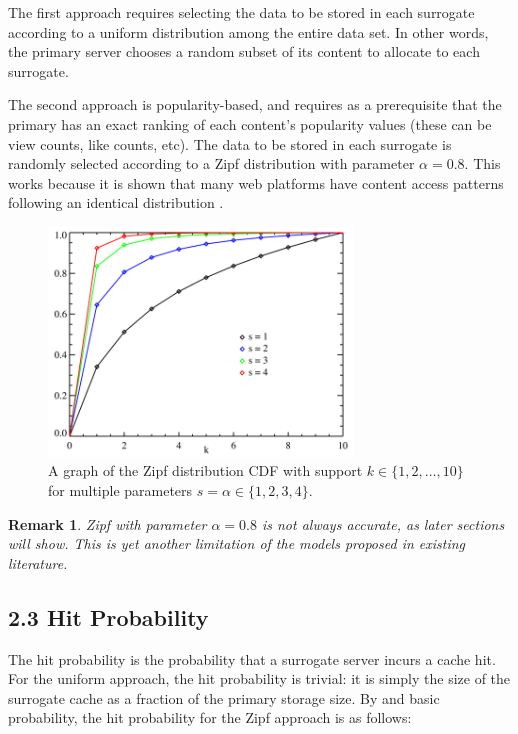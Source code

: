 \documentclass[
	a4paper, %
	10pt, %
	unnumberedsections, %
	twoside, %
]{LTJournalArticle}
\newtheorem*{remark}{Remark}
\begin{document}
The first approach requires selecting the data to be stored in each surrogate according to a uniform distribution among the entire data set. In other words, the primary server chooses a random subset of its content to allocate to each surrogate. 

The second approach is popularity-based, and requires as a prerequisite that the primary has an exact ranking of each content's popularity values (these can be view counts, like counts, etc). The data to be stored in each surrogate is randomly selected according to a Zipf distribution with parameter $\alpha = 0.8$. This works because it is shown that many web platforms have content access patterns following an identical distribution \cite{749260}.

\begin{figure}[h]
	\begin{center}
		\includegraphics[width=8.1cm]{zipf.png}
	\end{center}
	\caption{A graph of the Zipf distribution CDF with support $k\in\{1, 2, \ldots, 10 \}$ for multiple parameters $s=\alpha \in \{1,2,3,4\}$.}
\end{figure}

\begin{remark}
    Zipf with parameter $\alpha=0.8$ is not always accurate, as later sections will show. This is yet another limitation of the models proposed in existing literature.
\end{remark}

\subsection{2.3  Hit Probability}

The hit probability is the probability that a surrogate server incurs a cache hit. For the uniform approach, the hit probability is trivial: it is simply the size of the surrogate cache as a fraction of the primary storage size. By \cite{749260} and basic probability, the hit probability for the Zipf approach is as follows:
\end{document}
